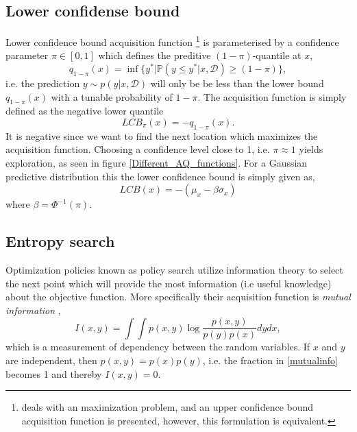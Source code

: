 
\subsection{Lower confidense bound}
Lower confidence bound acquisition function \cite[145]{bayesoptbook}\footnote{
\cite[145]{bayesoptbook} deals with an maximization problem, and an upper confidence bound
acquisition function is presented, however, this formulation is equivalent.} is parameterised by a
confidence parameter $\pi \in [0,1]$ which defines the preditive $(1-\pi)$-quantile at $x$,
 $$q_{1-\pi}(x) = \inf \{y^*|\mathbb{P}(y\leq y^* | x, \mathcal{D}) \geq (1-\pi) \},$$
i.e. the prediction $y \sim p(y|x, \mathcal{D})$ will only be be less than the lower bound $q_{1-\pi}(x) $
with a tunable probability of $1-\pi$. 
The acquisition function is simply defined as the negative lower quantile
$$LCB_{\pi}(x) = -q_{1-\pi}(x).$$ It is negative since we want to find the next location which
maximizes the acquisition function. Choosing a confidence level close to 1, i.e. $\pi \approx 1$ yields
exploration, as seen in figure \ref{Different_AQ_functions}. For a Gaussian predictive distribution
this the lower confidence bound is simply given as, 
$$LCB(x) = - (\mu_x - \beta \sigma_x)$$
where $\beta = \Phi^{-1}(\pi)$. 

\subsection{Entropy search}
Optimization policies known as policy search utilize information theory to select the next point
which will provide the most information (i.e useful knowledge) about the objective function. 
More specifically their acquisition function is \textit{mutual information} \cite[135-140]{bayesoptbook}, 
\begin{equation}\label{mutualinfo}
    I(x,y) = \int \int p(x,y) \log \frac{p(x,y)}{p(y)p(x)} dy dx,
\end{equation}
which is a measurement of dependency between the random variables. If $x$ and $y$ are independent, then
$p(x,y) = p(x)p(y)$, i.e. the fraction in \eqref{mutualinfo} becomes 1 and thereby $I(x,y) = 0$. 



